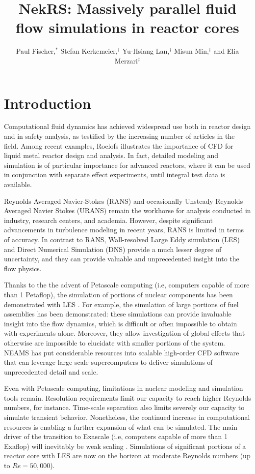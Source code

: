 \documentclass{anstrans}
\title{NekRS: Massively parallel fluid flow simulations in reactor cores}
\author{Paul Fischer,$^{*}$ Stefan Kerkemeier,$^{\dagger}$ Yu-Hsiang Lan,$^{\dagger}$ Misun Min,$^{\dagger}$ and Elia Merzari$^{\ddagger}$}
\institute{
$^{*}$ University of Illinois at Urbana-Champaign, fischerp@illinois.edu
\and
$^{\dagger}$ Argonne National Laboratory
\and
$^{\ddagger}$ Pennsylvania State University
}
\begin{document}
\section{Introduction}

Computational fluid dynamics has achieved  widespread use both in reactor design and in safety analysis, as testified by the increasing number of articles in the field. Among recent examples, Roelofs \cite{roelofs2018thermal} illustrates the importance of CFD for liquid metal reactor design and analysis. In fact, detailed modeling and simulation is of particular importance for advanced reactors,  where it can be used in conjunction with separate effect experiments, until integral test data is available.

\medskip
Reynolds Averaged Navier-Stokes (RANS) and occasionally Unsteady Reynolds Averaged Navier Stokes (URANS) remain the workhorse for analysis conducted in industry, research centers, and academia.  However, despite significant advancements in turbulence modeling in recent years, RANS is limited in terms of accuracy.   In contrast to RANS, Wall-resolved Large Eddy simulation (LES) and Direct Numerical Simulation (DNS) provide a much lesser degree of uncertainty, and they can provide valuable and unprecedented insight into the flow physics.

\medskip
Thanks to the the advent of Petascale computing (i.e, computers capable of more than 1 Petaflop), the simulation of portions of nuclear components has been demonstrated with LES \cite{merzari2020}. For example, the simulation of large portions of fuel assemblies has been demonstrated:  these simulations can provide invaluable insight into the flow dynamics, which is difficult or often impossible to obtain with experiments alone. Moreover, they allow investigation of global effects that otherwise are impossible to elucidate with smaller portions of the system. NEAMS has put considerable resources into scalable high-order CFD software that can leverage large scale supercomputers to deliver simulations of unprecedented detail and scale.

\medskip
Even with Petascale computing, limitations in nuclear modeling and simulation tools remain. Resolution requirements limit our capacity to reach higher Reynolds numbers, for instance. Time-scale separation also limits severely our capacity to simulate transient behavior. Nonetheless, the continued increase in computational resources is enabling a further expansion of what can be simulated. The main driver of the transition to Exascale (i.e, computers capable of more than 1 Exaflop) will inevitably be weak scaling \cite{merzari2017large}. Simulations of significant portions of a reactor core with LES are now on the horizon at moderate Reynolds numbers (up to $Re=50,000$).
\end{document}

